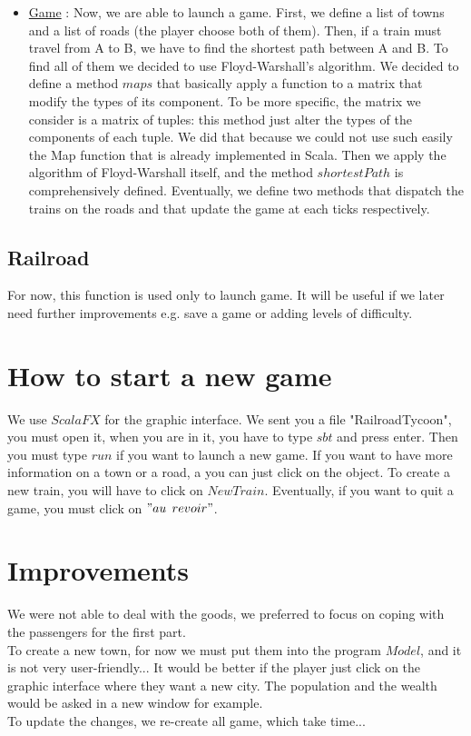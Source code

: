 \documentclass[a4paper]{article}
\begin{document}
\begin{itemize}
		\item \underline{Game} : Now, we are able to launch a game. First, we define a list of towns and a list of roads (the player choose both of them). Then, if a train must travel from A to B, we have to find the shortest path between A and B. To find all of them we decided to use Floyd-Warshall's algorithm. 
		We decided to define a method $maps$ that basically apply a function to a matrix that modify the types of its component. To be more specific, the matrix we consider is a matrix of tuples: this method just alter the types of the components of each tuple. We did that because we could not use such easily the Map function that is already implemented in Scala. 
		Then we apply the algorithm of Floyd-Warshall itself, and the method $shortestPath$ is comprehensively defined.
		Eventually, we define two methods that dispatch the trains on the roads and that update the game at each ticks respectively. 
		
		
		
		
	\end{itemize}
	\subsection{Railroad}
	For now, this function is used only to launch game. It will be useful if we later need further improvements e.g. save a game or adding levels of difficulty.
	\section{How to start a new game}
	
	We use $ScalaFX$ for the graphic interface. We sent you a file "RailroadTycoon", you must open it, when you are in it, you have to type $sbt$ and press enter. Then you must type $run$ if you want to launch a new game.
	If you want to have more information on a town or a road, a you can just click on the object.
	To create a new train, you will have to click on $New Train$. Eventually, if you want to quit a game, you must click on $"au$ $revoir"$.
		
	\section{Improvements}
	We were not able to deal with the goods, we preferred to focus on coping with the passengers for the first part.\\
	To create a new town, for now we must put them into the program $Model$, and it is not very user-friendly... It would be better if the player just click on the graphic interface where they want a new city. The population and the wealth would be asked in a new window for example.\\
	To update the changes, we re-create all game, which take time...
	
\end{document}
